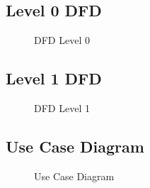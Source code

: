 \subsection{Level 0 DFD}
\begin{figure}[htbp]
	\centering
	\caption{DFD Level 0}
	\label{fig:dfd0}
\end{figure}

\subsection{Level 1 DFD}
\begin{figure}[htbp]
	\centering
	\caption{DFD Level 1}
	\label{fig:dfd1}
\end{figure}

\newpage

\subsection{Use Case Diagram}
\begin{figure}[htbp]
	\centering
	\caption{Use Case Diagram}
	\label{fig:Use_Case_Diagram}
\end{figure}

